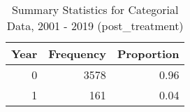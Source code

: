 \begin{table}
\centering
\caption{Summary Statistics for Categorial Data, 2001 - 2019 (post_treatment)}
\label{post_treatment}
\begin{tabular}{rrr}
\toprule
 Year &  Frequency &  Proportion \\
\midrule
    0 &       3578 &        0.96 \\
    1 &        161 &        0.04 \\
\bottomrule
\end{tabular}
\end{table}
